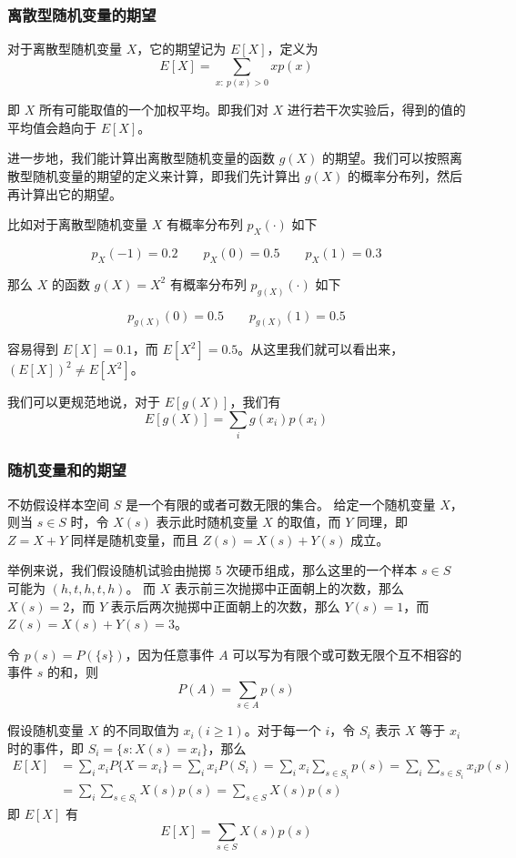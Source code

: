 \documentclass[utf8,a4paper,nofonts,9pt]{ctexbook}
\begin{document}
\subsubsection{离散型随机变量的期望}

对于离散型随机变量 $X$，它的期望记为 $E[X]$，定义为
\[
    E[X] = \sum_{x:\ p(x) > 0} x p(x)
\]

即 $X$ 所有可能取值的一个加权平均。即我们对 $X$ 进行若干次实验后，得到的值的平均值会趋向于 $E[X]$。

进一步地，我们能计算出离散型随机变量的函数 $g(X)$ 的期望。我们可以按照离散型随机变量的期望的定义来计算，即我们先计算出 $g(X)$ 的概率分布列，然后再计算出它的期望。

\begin{exampleBox}
    比如对于离散型随机变量 $X$ 有概率分布列 $p_X( \cdot )$ 如下

    \[
        p_X(-1) = 0.2 \qquad p_X(0) = 0.5 \qquad p_X(1) = 0.3
    \]

    那么 $X$ 的函数 $g(X) = X^2$ 有概率分布列 $p_{g(X)}( \cdot )$ 如下

    \[
        p_{g(X)}(0) = 0.5 \qquad p_{g(X)}(1) = 0.5
    \]

    容易得到 $E[X] = 0.1$，而 $E[X^2] = 0.5$。从这里我们就可以看出来，$(E[X])^2 \ne E[X^2]$。
\end{exampleBox}

我们可以更规范地说，对于 $E[g(X)]$，我们有
\[
    E[g(X)] = \sum_{i} g(x_i) p(x_i)
\]

\subsubsection{随机变量和的期望}

不妨假设样本空间 $S$ 是一个有限的或者可数无限的集合。
给定一个随机变量 $X$，则当 $s \in S$ 时，令 $X(s)$ 表示此时随机变量 $X$ 的取值，而 $Y$ 同理，即 $Z = X + Y$ 同样是随机变量，而且 $Z(s) = X(s) + Y(s)$ 成立。

举例来说，我们假设随机试验由抛掷 5 次硬币组成，那么这里的一个样本 $s \in S$ 可能为 $(h, t, h, t, h)$。
而 $X$ 表示前三次抛掷中正面朝上的次数，那么 $X(s) = 2$，而 $Y$ 表示后两次抛掷中正面朝上的次数，那么 $Y(s) = 1$，而 $Z(s) = X(s) + Y(s) = 3$。

令 $p(s) = P(\{ s \})$，因为任意事件 $A$ 可以写为有限个或可数无限个互不相容的事件 $s$ 的和，则
\[
    P(A) = \sum_{s \in A} p(s)
\]

假设随机变量 $X$ 的不同取值为 $x_i ( i \ge 1 )$。对于每一个 $i$，令 $S_i$ 表示 $X$ 等于 $x_i$ 时的事件，即 $S_i = \{ s: X(s) = x_i \}$，那么
\begin{align*}
    E[X] & = \sum_{i} x_i P\{ X = x_i \} = \sum_{i} x_i P(S_i) = \sum_{i} x_i \sum_{s \in S_i} p(s) = \sum_{i} \sum_{s \in S_i} x_i p(s) \\
         & = \sum_i \sum_{s \in S_i} X(s) p(s) = \sum_{s \in S} X(s) p(s)
\end{align*}
即 $E[X]$ 有
\[
    E[X] = \sum_{s \in S} X(s) p(s)
\]
\end{document}
